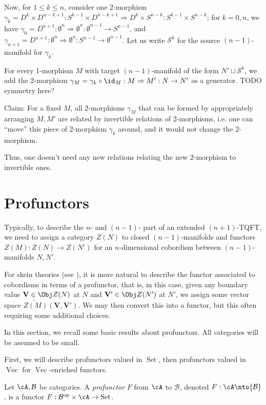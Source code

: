 \documentclass[12pt]{article}
\newcommand{\empt}[1]{{\emptyset^{#1}}}
\newcommand{\VV}{{\mathbf{V}}}
\newcommand{\op}{{\text{op}}}
\newcommand{\wdtld}[1]{{\widetilde{#1}}}
\newcommand{\cB}{{\mathcal{B}}}
\DeclareMathOperator{\Set}{Set}
\DeclareMathOperator{\Vect}{Vec}
\begin{document}
Now, for $1 \leq k \leq n$,
consider one 2-morphism
$\gamma_k = D^k \times D^{n-k+1} : S^{k-1} \times D^{n-k+1}
\Rightarrow D^k \times S^{n-k}
: S^{k-1} \times S^{n-k}$;
for $k = 0,n$, we have
$\gamma_0 = D^{n+1} : \empt{n} \Rightarrow \empt{n}
: \empt{n-1} \to S^{n-1}$,
and
$\gamma_{n+1} = D^{n+1} : \empt{n} \Rightarrow \empt{n}
: S^{n-1} \to \empt{n-1}$.
Let us write $\mathcal{S}^k$ for the source $(n-1)$-manifold
for $\gamma_k$.

For every 1-morphism $M$ with target $(n-1)$-manifold
of the form $N' \sqcup \mathcal{S}^k$,
we add the 2-morphism
$\gamma_M = \gamma_k \circ \id_M
: M \Rightarrow M' : N \to N'$
as a generator.
TODO symmetry here?

Claim: For a fixed $M$, all 2-morphisms $\gamma_M$
that can be formed by appropriately arranging $M,M'$
are related by invertible relations of 2-morphisms,
i.e. one can ``move'' this piece of 2-morphism
$\gamma_k$ around, and it would not change
the 2-morphism.

Thus, one doesn't need any new relations
relating the new 2-morphism to invertible ones.




\section{Profunctors}

Typically, to describe the $n$- and $(n-1)$- part of an
extended $(n+1)$-TQFT,
we need to assign a category $Z(N)$ to closed $(n-1)$-manifolds
and functors $Z(M): Z(N) \to Z(N')$
for an $n$-dimensional cobordism between $(n-1)$-manifolds
$N,N'$.

For skein theories (see ),
it is more natural to describe the functor
associated to cobordisms in terms of a profunctor,
that is, in this case,
given any boundary value $\VV \in \Obj Z(N)$ at $N$
and $\VV' \in \Obj Z(N')$ at $N'$,
we assign some vector space $\wdtld{Z(M)}(\VV,\VV')$.
We may then convert this into a functor,
but this often requiring some additional choices.


In this section, we recall some basic results about
profunctors.
All categories will be assumed to be small.

First, we will describe profunctors valued in $\Set$,
then profunctors valued in $\Vect$
for $\Vect$-enriched functors.

\begin{definition}
Let $\cA,\cB$ be categories.
A \emph{profunctor} $F$ from $\cA$ to $\cB$,
denoted $F: \cA \nto \cB$,
is a functor $F: \cB^\op \times \cA \to \Set$.
\end{definition}
\end{document}
